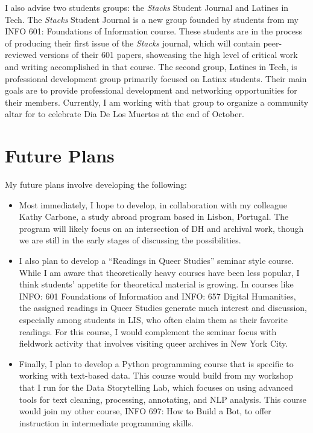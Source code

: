 \documentclass[12pt]{article}
\begin{document}
I also advise two students groups: the \emph{Stacks} Student Journal and
Latines in Tech. The \emph{Stacks} Student Journal is a new group founded
by students from my INFO 601: Foundations of Information course. These
students are in the process of producing their first issue of the
\emph{Stacks} journal, which will contain peer-reviewed versions of their
601 papers, showcasing the high level of critical work and writing
accomplished in that course. The second group, Latines in Tech, is
professional development group primarily focused on Latinx students.
Their main goals are to provide professional development and
networking opportunities for their members. Currently, I am working
with that group to organize a community altar for to celebrate Dia De
Los Muertos at the end of October.

\section*{Future Plans}
\label{sec:org243020a}
My future plans involve developing the following:
\begin{itemize}
\item Most immediately, I hope to develop, in collaboration with my
colleague Kathy Carbone, a study abroad program based in Lisbon,
Portugal. The program will likely focus on an intersection of DH and
archival work, though we are still in the early stages of discussing
the possibilities.
\item I also plan to develop a ``Readings in Queer Studies'' seminar style
course. While I am aware that theoretically heavy courses have been
less popular, I think students' appetite for theoretical material is
growing. In courses like INFO: 601 Foundations of Information and
INFO: 657 Digital Humanities, the assigned readings in Queer Studies
generate much interest and discussion, especially among students in
LIS, who often claim them as their favorite readings. For this
course, I would complement the seminar focus with fieldwork activity
that involves visiting queer archives in New York City.
\item Finally, I plan to develop a Python programming course that is
specific to working with text-based data. This course would build
from my workshop that I run for the Data Storytelling Lab, which
focuses on using advanced tools for text cleaning, processing,
annotating, and NLP analysis. This course would join my other
course, INFO 697: How to Build a Bot, to offer instruction in
intermediate programming skills.
\end{itemize}
\end{document}

